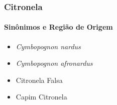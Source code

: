 \documentclass[aspectratio=169]{beamer}
\begin{document}
\begin{frame}
\frametitle{Citronela}
\framesubtitle{Sinônimos e Região de Origem}
	\begin{minipage}{0.49\textwidth}
		\begin{itemize}
			\item	\emph{Cymbopognon nardus} \pause
			\item \emph{Cymbopognon afronardus} \pause
			\item Citronela Falsa \pause
			\item Capim Citronela
		\end{itemize}
	\end{minipage}
	
	\begin{minipage}{0.49\textwidth}
		
	\end{minipage}

\end{frame}
\end{document}
